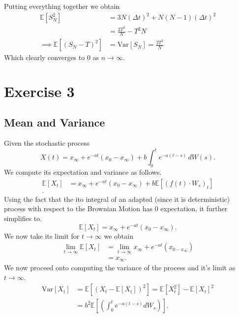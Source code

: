 \documentclass[a4paper,12pt]{article} %
\newcommand{\Var}{\mathrm{Var}}
\begin{document}
Putting everything together we obtain
\begin{align*}
    \mathbb{E} \left[ S_N^2 \right]                             & = 3N (\Delta t)^{2} +N(N-1)(\Delta t)^{2} \\
                                                                & = \frac{2T^2}{N}-T^2{N}                   \\
    \implies \mathbb{E} \left[ \left( S_N  -T\right)^2  \right] & = \Var\left[S_N  \right] = \frac{2T^2}{N}
\end{align*}
Which clearly converges to \(0\) as \(n\to  \infty \).

\section{Exercise 3}
\subsection{Mean and Variance}
Given the stochastic process
\begin{equation}
    X(t) = x_{\infty} + e^{-at} (x_0 - x_{\infty}) + b \int_0^t e^{-a(t-s)} \, dW(s).
\end{equation}
We compute its expectation and variance as follows.
\begin{align*}
    \mathbb{E} \left[ X_t \right] & = x_\infty + e^{-at}(x_0 - x_\infty ) + b \mathbb{E} \left[ (f(t) \cdot W_s)_t \right] \\.
\end{align*}
Using the fact that the ito integral of an adapted (since it is deterministic) process with respect to the Brownian Motion has 0 expectation, it further simplifies to.
\begin{equation}
    \mathbb{E} \left[ X_t \right]  = x_\infty  + e^{-at}(x_0 -x_\infty ).
\end{equation}
We now take its limit for \(t\to \infty \) we obtain
\begin{align*}
    \lim_{t \to \infty} \mathbb{E} \left[ X_t \right] & = \lim_{t \to \infty} x_\infty + e^{-at}(x_{0- x_\infty } ) \\
                                                      & = x_\infty .
\end{align*}
We now proceed onto computing the variance of the process and it's limit as \(t\to \infty \).
\begin{align*}
    \Var\left[X_t \right] & = \mathbb{E} \left[ (X_t - \mathbb{E} \left[ X_t \right])^2 \right]  = \mathbb{E} \left[ X_{t} ^{2}  \right] - \mathbb{E} \left[ X_t \right]^{2} \\
                          & = b^2 \mathbb{E} \left[ \left( \int _0^t e^{-a(t-s)}dW_s \right)  \right].
\end{align*}
\end{document}
